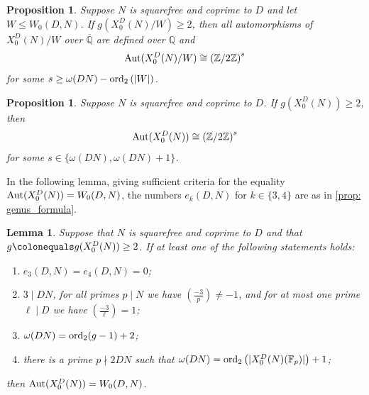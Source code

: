\documentclass[11pt,reqno]{amsart}
\newcommand{\F}{\mathbb{F}}
\newcommand{\Q}{\mathbb{Q}}
\newcommand{\Z}{\mathbb{Z}}
\newcommand{\Aut}{{\rm Aut}}
\newcommand{\ord}{\operatorname{ord}}
\newtheorem{lemma}[theorem]{Lemma}
\newtheorem{proposition}[theorem]{Proposition}
\theoremstyle{definition}
\newcommand{\Pietro}[1]{{\color{orange}{??Pietro: #1}}} %
\newcommand{\freddy}[1]{{\color{purple}{$\spadesuit$ Freddy: #1}}}
\begin{document}
\begin{proposition}\cite[Proposition 1.5]{KR08}\label{prop: KR_quotient}
Suppose $N$ is squarefree and coprime to $D$ and let $W \leq W_0(D,N)$. If $g(X_0^D(N)/W) \geq 2$, then all automorphisms of $X_0^D(N)/W$ over $\overline{\Q}$ are defined over $\Q$ and 
\[ \textnormal{Aut}(X_0^D(N)/W) \cong \left(\Z/2\Z\right)^s \] 
for some $s \geq \omega(DN) - \textnormal{ord}_2\left(|W|\right)$. 
\end{proposition}

\begin{proposition}\cite[Corollary 1.8]{KR08}\label{prop: KR_top_curve}
Suppose $N$ is squarefree and coprime to $D$. If $g(X_0^D(N)) \geq 2$, then 
\[ \textnormal{Aut}(X_0^D(N)) \cong \left(\Z/2\Z\right)^s \] 
for some $s \in \{\omega(DN), \omega(DN)+1\}$. 
\end{proposition}

In the following lemma, giving sufficient criteria for the equality $\Aut(X_0^D(N)) = W_0(D,N)$, the numbers $e_k(D,N)$ for $k \in \{3,4\}$ are as in \cref{prop: genus_formula}.

\begin{lemma}\cite[Theorems 1.6 and 1.7]{KR08}\label{lemma: KR_all_atkin_lehner}
Suppose that $N$ is squarefree and coprime to $D$ and that $g \colonequals g(X_0^D(N)) \geq 2$. If at least one of the following statements holds:
\begin{enumerate}
    \item $e_3(D,N) = e_4(D,N) = 0$;
    \item $3 \mid DN$, for all primes $p \mid N$ we have $\left(\frac{-3}{p}\right) \ne -1$, and for at most one prime $\ell \mid D$ we have $\left(\frac{-3}{\ell}\right) = 1$;
    \item $\omega(DN) = \textnormal{ord}_2(g-1)+2$;%
    \item there is a prime $p \nmid 2DN$ such that $\omega(DN) = \textnormal{ord}_2\left(|X_0^D(N)(\F_p)|\right) + 1$;
\end{enumerate}
then $\Aut(X_0^D(N)) = W_0(D,N)$. 
\end{lemma}
\end{document}
